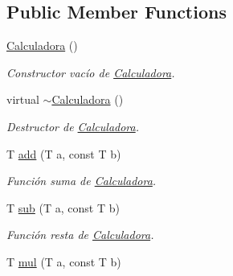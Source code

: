 \subsection*{Public Member Functions}
\begin{DoxyCompactItemize}
\item 
\hypertarget{class_calculadora_a385159b71410804ebe0daa54d7e05d1e}{\hyperlink{class_calculadora_a385159b71410804ebe0daa54d7e05d1e}{Calculadora} ()}\label{class_calculadora_a385159b71410804ebe0daa54d7e05d1e}

\begin{DoxyCompactList}\small\item\em Constructor vacío de \hyperlink{class_calculadora}{Calculadora}. \end{DoxyCompactList}\item 
\hypertarget{class_calculadora_a9a59d0072fd27163625e14ab90d9ad1e}{virtual \hyperlink{class_calculadora_a9a59d0072fd27163625e14ab90d9ad1e}{$\sim$\+Calculadora} ()}\label{class_calculadora_a9a59d0072fd27163625e14ab90d9ad1e}

\begin{DoxyCompactList}\small\item\em Destructor de \hyperlink{class_calculadora}{Calculadora}. \end{DoxyCompactList}\item 
\hypertarget{class_calculadora_a648f902edf66a0fc1e17469d3fa61471}{T \hyperlink{class_calculadora_a648f902edf66a0fc1e17469d3fa61471}{add} (T a, const T b)}\label{class_calculadora_a648f902edf66a0fc1e17469d3fa61471}

\begin{DoxyCompactList}\small\item\em Función suma de \hyperlink{class_calculadora}{Calculadora}. \end{DoxyCompactList}\item 
\hypertarget{class_calculadora_ae92d8eb0a75b146167bebcfbbc2b0bfd}{T \hyperlink{class_calculadora_ae92d8eb0a75b146167bebcfbbc2b0bfd}{sub} (T a, const T b)}\label{class_calculadora_ae92d8eb0a75b146167bebcfbbc2b0bfd}

\begin{DoxyCompactList}\small\item\em Función resta de \hyperlink{class_calculadora}{Calculadora}. \end{DoxyCompactList}\item 
\hypertarget{class_calculadora_a88b22c85e262aa507630f03e77a6c066}{T \hyperlink{class_calculadora_a88b22c85e262aa507630f03e77a6c066}{mul} (T a, const T b)}\label{class_calculadora_a88b22c85e262aa507630f03e77a6c066}


\end{DoxyCompactItemize}
